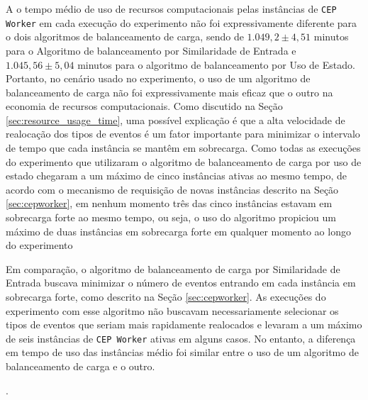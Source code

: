 
A o tempo médio de uso de recursos computacionais pelas instâncias de \texttt{CEP Worker} em cada execução do experimento não foi expressivamente diferente para o dois algoritmos de balanceamento de carga, sendo de  $1.049,2 \pm 4,51$ minutos para o Algoritmo de balanceamento por Similaridade de Entrada e $1.045,56 \pm 5,04$ minutos para o algoritmo de balanceamento por Uso de Estado. Portanto, no cenário usado no experimento, o uso de um algoritmo de balanceamento de carga não foi expressivamente mais eficaz que o outro na economia de recursos computacionais. Como discutido na Seção \ref{sec:resource_usage_time}, uma possível explicação é que a alta velocidade de realocação dos tipos de eventos é um fator importante para minimizar o intervalo de tempo que cada instância se mantêm em sobrecarga. Como todas as execuções do experimento que utilizaram o algoritmo de balanceamento de carga por uso de estado chegaram a um máximo de cinco instâncias ativas ao mesmo tempo, de acordo com o mecanismo de requisição de novas instâncias descrito na Seção \ref{sec:cepworker}, em nenhum momento três das cinco instâncias estavam em sobrecarga forte ao mesmo tempo, ou seja, o uso do algoritmo propiciou um máximo de duas instâncias em sobrecarga forte em qualquer momento ao longo do experimento

Em comparação, o algoritmo de balanceamento de carga por Similaridade de Entrada buscava minimizar o número de eventos entrando em cada instância em sobrecarga forte, como descrito na Seção \ref{sec:cepworker}. As execuções do experimento com esse algoritmo não buscavam necessariamente selecionar os tipos de eventos que seriam mais rapidamente realocados e levaram a um máximo de seis instâncias de \texttt{CEP Worker} ativas em alguns casos. No entanto, a diferença em tempo de uso das instâncias médio foi similar entre o uso de um algoritmo de balanceamento de carga e o outro.

.  

